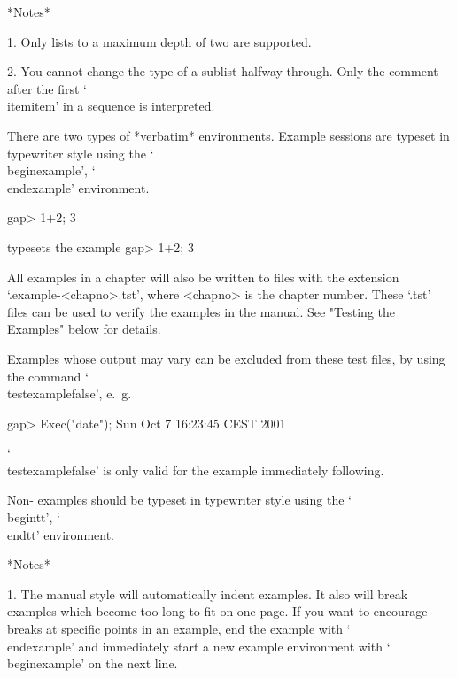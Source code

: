 *Notes*

\beginlist%
\item{1.} Only lists to a maximum depth of two are supported.

\item{2.} You cannot change the type of a sublist halfway through. Only
the comment after the first `\\itemitem' in a sequence is interpreted.

\endlist

\indextt{\\begintt}\indextt{\\endtt}
\indextt{\\beginexample}\indextt{\\endexample}
There are two types of *verbatim* environments.
Example {\GAP} sessions are typeset in typewriter style
using the `\\beginexample', `\\endexample' environment.

\begintt
\beginexample
gap> 1+2;
3
\endexample
\endtt

typesets the example
\beginexample
gap> 1+2;
3
\endexample

All examples in a chapter will also be written to files with the extension 
`.example-<chapno>.tst', where <chapno> is the chapter number. These `.tst'
files can be used to verify the examples in the manual. See 
"Testing the Examples" below for details.

Examples whose output may vary can be excluded from these test files, by
using the command `\\testexamplefalse', e.~g.

\begintt
\testexamplefalse
\beginexample
gap> Exec("date");
Sun Oct  7 16:23:45 CEST 2001
\endexample
\endtt

`\\testexamplefalse' is only valid for the example immediately following.

Non-{\GAP} examples should be typeset in typewriter style
using the `\\begintt', `\\endtt' environment.

*Notes*

\beginlist%

\item{1.}
The manual style will automatically indent examples. It also will break
examples which become too long to fit on one page. If you want to encourage
breaks at specific points in an example, end the example with `\\endexample'
and immediately start a new example environment with `\\beginexample' on
the next line.

